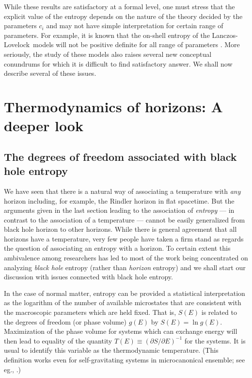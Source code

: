 \documentclass[12pt]{iopart}
\newcommand{\LL}{Lanczos-Lovelock}
\begin{document}
While these results are  satisfactory at a formal level, one must stress that the explicit value of the entropy  depends on the nature of the theory decided by the parameters $c_i$ and may not have simple interpretation for certain range of parameters.
For example,  it is known that the on-shell entropy of the \LL\ models will not be positive definite for all range of parameters
\cite{entneg}.
More seriously, the study of these models  also raises several new conceptual conundrums for which it is difficult to find satisfactory answer. We shall now describe several of these issues.



\section{Thermodynamics of horizons: A deeper look}\label{sec:thermosecond}


\subsection{The degrees of freedom associated with black hole entropy}

We have seen that there is a natural way of associating a temperature with \textit{any}
horizon including, for example, the Rindler horizon in flat spacetime. But the arguments given in the last section leading to the association of \textit{entropy} --- in contrast to the association of a temperature --- cannot be easily generalized from black hole horizon to other horizons. While there is general agreement that all horizons have a temperature,
very few people \cite{Carlip:1999cy,tpted1,TPgravcqg04,tworeviews} have taken a firm stand as regards the question of associating an entropy with a horizon. To certain extent this ambivalence among researchers has led to most of the work being concentrated on analyzing \textit{black hole} entropy (rather than 
\textit{horizon} entropy) and we shall start our discussion with issues connected with black hole 
entropy.

   
   In the case of normal matter, entropy can be provided
   a statistical interpretation  as the logarithm of the number of 
   available microstates that are consistent with the macroscopic parameters which are
   held fixed. That is,  $S(E)$ is related to the 
degrees of freedom (or phase volume) $g(E)$ by $S(E)=\ln g(E)$. Maximization of the phase 
volume for systems which can exchange energy
will then lead to equality of the quantity $T(E)\equiv (\partial S/\partial E)^{-1}$ for the systems. 
It is usual to identify this variable as the thermodynamic temperature. 
(This definition works even for self-gravitating systems in microcanonical ensemble; 
see eg., \cite{Padmanabhan:1990gm}.)
\end{document}
